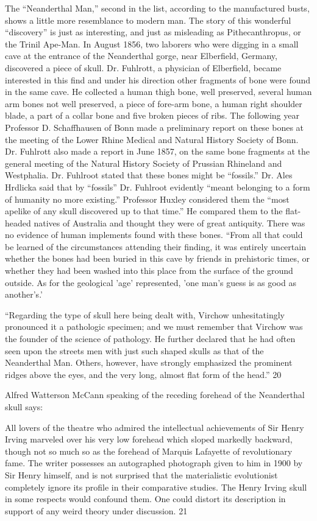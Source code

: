 The ``Neanderthal Man,'' second in the list, according to the manufactured busts, shows a
little more resemblance to modern man. The story of this wonderful ``discovery'' is just as
interesting, and just as misleading as Pithecanthropus, or the Trinil Ape-Man. In August
1856, two laborers who were digging in a small cave at the entrance of the Neanderthal
gorge, near Elberfield, Germany, discovered a piece of skull. Dr. Fuhlrott, a physician of
Elberfield, became interested in this find and under his direction other fragments of bone
were found in the same cave. He collected a human thigh bone, well preserved, several
human arm bones not well preserved, a piece of fore-arm bone, a human right shoulder blade,
a part of a collar bone and five broken pieces of ribs. The following year Professor D.
Schaffhausen of Bonn made a preliminary report on these bones at the meeting of the Lower
Rhine Medical and Natural History Society of Bonn. Dr. Fuhlrott also made a report in June
1857, on the same bone fragments at the general meeting of the Natural History Society of
Prussian Rhineland and Westphalia. Dr. Fuhlroot stated that these bones might be ``fossils.''
Dr. Ales Hrdlicka said that by ``fossils'' Dr. Fuhlroot evidently ``meant belonging to a form of
humanity no more existing.'' Professor Huxley considered them the ``most apelike of any
skull discovered up to that time.'' He compared them to the flat-headed natives of Australia
and thought they were of great antiquity. There was no evidence of human implements found
with these bones. ``From all that could be learned of the circumstances attending their
finding, it was entirely uncertain whether the bones had been buried in this cave by friends in
prehistoric times, or whether they had been washed into this place from the surface of the
ground outside. As for the geological 'age' represented, 'one man's guess is as good as
another's.'

``Regarding the type of skull here being dealt with, Virchow unhesitatingly pronounced it a
pathologic specimen; and we must remember that Virchow was the founder of the science of
pathology. He further declared that he had often seen upon the streets men with just such
shaped skulls as that of the Neanderthal Man. Others, however, have strongly emphasized the
prominent ridges above the eyes, and the very long, almost flat form of the head.'' 20

Alfred Watterson McCann speaking of the receding forehead of the Neanderthal skull says:

All lovers of the theatre who admired the intellectual achievements of Sir Henry Irving
marveled over his very low forehead which sloped markedly backward, though not so much
so as the forehead of Marquis Lafayette of revolutionary fame. The writer possesses an
autographed photograph given to him in 1900 by Sir Henry himself, and is not surprised that
the materialistic evolutionist completely ignore its profile in their comparative studies. The
Henry Irving skull in some respects would confound them. One could distort its description
in support of any weird theory under discussion. 21

